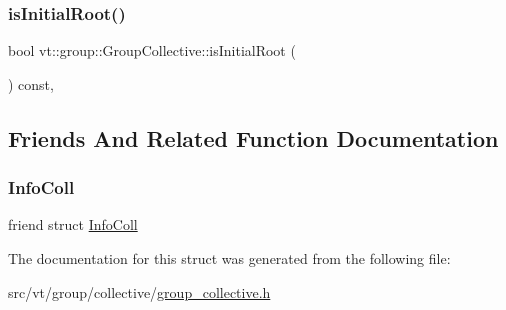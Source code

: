 \mbox{\label{structvt_1_1group_1_1_group_collective_a7886a22a287c1a14ec107bdfc38d297e}} 
\subsubsection{\texorpdfstring{is\+Initial\+Root()}{isInitialRoot()}}
{\footnotesize\ttfamily bool vt\+::group\+::\+Group\+Collective\+::is\+Initial\+Root (\begin{DoxyParamCaption}{ }\end{DoxyParamCaption}) const\hspace{0.3cm}{\ttfamily [inline]}, {\ttfamily [protected]}}



\subsection{Friends And Related Function Documentation}
\mbox{\label{structvt_1_1group_1_1_group_collective_a977ca475df628d7e164bae4a7a97c001}} 
\subsubsection{\texorpdfstring{Info\+Coll}{InfoColl}}
{\footnotesize\ttfamily friend struct \hyperlink{structvt_1_1group_1_1_info_coll}{Info\+Coll}\hspace{0.3cm}{\ttfamily [friend]}}



The documentation for this struct was generated from the following file\+:\begin{DoxyCompactItemize}
\item 
src/vt/group/collective/\hyperlink{group__collective_8h}{group\+\_\+collective.\+h}\end{DoxyCompactItemize}
